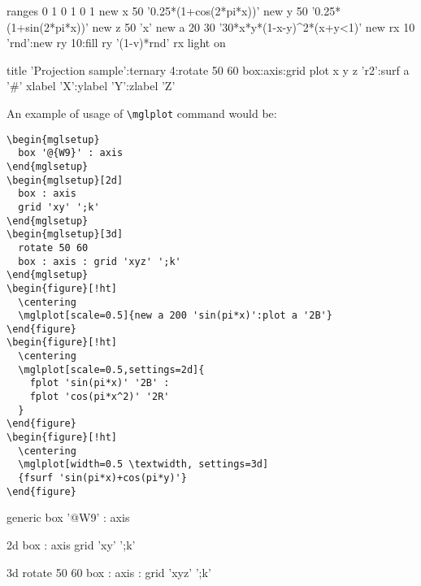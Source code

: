 \documentclass{article}
\begin{document}
\begin{mglverbatim}
  ranges 0 1 0 1 0 1
  new x 50 '0.25*(1+cos(2*pi*x))'
  new y 50 '0.25*(1+sin(2*pi*x))'
  new z 50 'x'
  new a 20 30 '30*x*y*(1-x-y)^2*(x+y<1)'
  new rx 10 'rnd':new ry 10:fill ry '(1-v)*rnd' rx
  light on
  
  title 'Projection sample':ternary 4:rotate 50 60
  box:axis:grid
  plot x y z 'r2':surf a '#'
  xlabel 'X':ylabel 'Y':zlabel 'Z'
\end{mglverbatim}


An example of usage of \texttt{\textbackslash{}mglplot} command would be:
\begin{verbatim}
\begin{mglsetup}
  box '@{W9}' : axis
\end{mglsetup}
\begin{mglsetup}[2d]
  box : axis
  grid 'xy' ';k'
\end{mglsetup}
\begin{mglsetup}[3d]
  rotate 50 60
  box : axis : grid 'xyz' ';k'
\end{mglsetup}
\begin{figure}[!ht]
  \centering
  \mglplot[scale=0.5]{new a 200 'sin(pi*x)':plot a '2B'}
\end{figure}
\begin{figure}[!ht]
  \centering
  \mglplot[scale=0.5,settings=2d]{
    fplot 'sin(pi*x)' '2B' :
    fplot 'cos(pi*x^2)' '2R'
  }
\end{figure}
\begin{figure}[!ht]
  \centering
  \mglplot[width=0.5 \textwidth, settings=3d]
  {fsurf 'sin(pi*x)+cos(pi*y)'}
\end{figure}
\end{verbatim}

\begin{mglsetup}{generic}
  box '@{W9}' : axis
\end{mglsetup}
\begin{mglsetup}{2d}
  box : axis
  grid 'xy' ';k'
\end{mglsetup}
\begin{mglsetup}{3d}
  rotate 50 60
  box : axis : grid 'xyz' ';k'
\end{mglsetup}
\begin{figure}[!ht]
  \centering
\end{figure}
\begin{figure}[!ht]
  \centering
\end{figure}
\begin{figure}[!ht]
  \centering
\end{figure}
\end{document}
